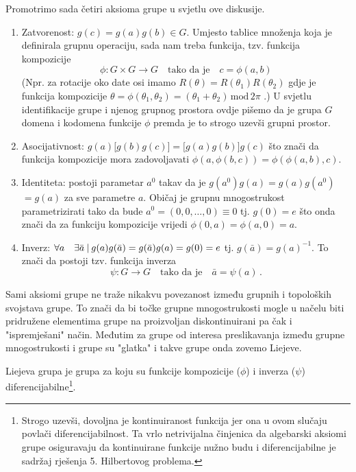 Promotrimo sada četiri aksioma grupe u svjetlu ove diskusije.
\begin{enumerate}
\item Zatvorenost: $g(c)=g(a)g(b) \in G$. Umjesto tablice množenja koja
    je definirala grupnu operaciju, sada nam treba funkcija, tzv.
    funkcija kompozicije
    \[\phi: G\times G \to G \quad  \text{tako da je} \quad c=\phi(a,b) \]
    (Npr. za rotacije oko date osi imamo $R(\theta) = R(\theta_1) R(\theta_2)$
    gdje je funkcija kompozicije  $\theta = \phi(\theta_1, \theta_2) =
    (\theta_1 + \theta_2)\, \mathrm{mod}\, 2\pi$ .) U svjetlu identifikacije
    grupe i njenog grupnog prostora ovdje pišemo da je grupa $G$ domena i kodomena funkcije $\phi$
    premda je to strogo uzevši grupni prostor.

\item Asocijativnost: $g(a)\big[g(b)g(c)\big]=\big[g(a)g(b)\big]g(c)$ što
    znači da funkcija kompozicije mora zadovoljavati
    $\phi(a, \phi(b,c))=\phi(\phi(a,b),c) $.

\item Identiteta: postoji parametar $a^0$ takav da je 
       $g(a^0)g(a)$$=g(a)g(a^0)$$=g(a)$ za sve parametre $a$.
    Običaj je grupnu mnogostrukost parametrizirati tako da bude $a^0=(0, 0, \ldots, 0)
     \equiv 0$ tj. $g(0)=e$ što onda znači da za funkciju
     kompozicije vrijedi $\phi(0,a)=\phi(a,0)=a$.

\item Inverz: $\forall a\quad \exists \bar{a} \: | \: g(a)g(\bar{a})=
        g(\bar{a})g(a)=g(0)=e$ tj. $g(\bar{a})=g(a)^{-1}$. To znači
        da postoji tzv. funkcija inverza
        \[ \psi:G\to G   \quad  \text{tako da je} \quad \bar{a}=\psi(a) \,. \]

\end{enumerate}

Sami aksiomi grupe ne traže nikakvu povezanost između grupnih i topoloških
svojstava grupe. To znači da bi točke grupne mnogostrukosti mogle u načelu biti
pridružene elementima grupe na proizvoljan diskontinuirani pa čak i "ispremješani"
način. Međutim za grupe od interesa preslikavanja između grupne mnogostrukosti
i grupe su "glatka" i takve grupe onda zovemo Liejeve.

\begin{definicija}
  Liejeva grupa je grupa za koju su funkcije kompozicije
($\phi$) i inverza ($\psi$) diferencijabilne\footnote{Strogo uzevši, 
    dovoljna je kontinuiranost funkcija jer ona u ovom slučaju povlači diferencijabilnost.
 Ta vrlo netrivijalna činjenica da algebarski aksiomi
 grupe osiguravaju da kontinuirane funkcije nužno budu i diferencijabilne
 je sadržaj rješenja 5. Hilbertovog problema.}.
\end{definicija}

